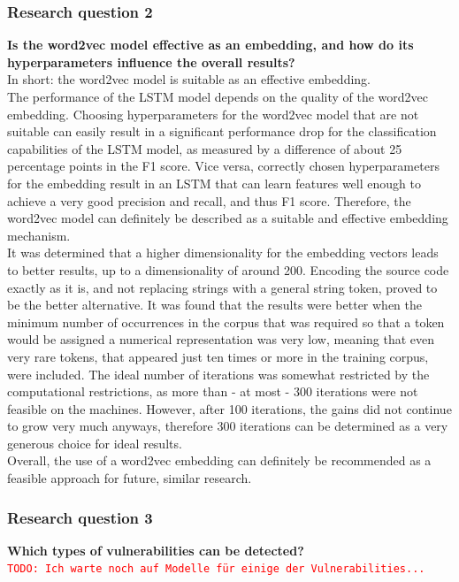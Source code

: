 \documentclass[
a4paper,
pagesize,
pdftex,
12pt,
twoside, %
BCOR=5mm, %
ngerman,
fleqn,
final,
]{scrartcl}
\begin{document}
	\subsubsection{Research question 2}
	\textbf{Is the word2vec model effective as an embedding, and how do its hyperparameters influence the overall results?}\\
	In short: the word2vec model is suitable as an effective embedding.\\
	The performance of the LSTM model depends on the quality of the word2vec embedding. Choosing hyperparameters for the word2vec model that are not suitable can easily result in a significant performance drop for the classification capabilities of the LSTM model, as measured by a difference of about 25 percentage points in the F1 score. Vice versa, correctly chosen hyperparameters for the embedding result in an LSTM that can learn features well enough to achieve a very good precision and recall, and thus F1 score. Therefore, the word2vec model can definitely be described as a suitable and effective embedding mechanism.\\
	It was determined that a higher dimensionality for the embedding vectors leads to better results, up to a dimensionality of around 200. Encoding the source code exactly as it is, and not replacing strings with a general string token, proved to be the better alternative. It was found that the results were better when the minimum number of occurrences in the corpus that was required so that a token would be assigned a numerical representation was very low, meaning that even very rare tokens, that appeared just ten times or more in the training corpus, were included. The ideal number of iterations was somewhat restricted by the computational restrictions, as more than - at most - 300 iterations were not feasible on the machines. However, after 100 iterations, the gains did not continue to grow very much anyways, therefore 300 iterations can be determined as a very generous choice for ideal results.\\
	Overall, the use of a word2vec embedding can definitely be recommended as a feasible approach for future, similar research. 
	
	\subsubsection{Research question 3}
	\textbf{Which types of vulnerabilities can be detected?}\\
	\textcolor{red}{\texttt{TODO: Ich warte noch auf Modelle für einige der Vulnerabilities...}}
	
\end{document}
